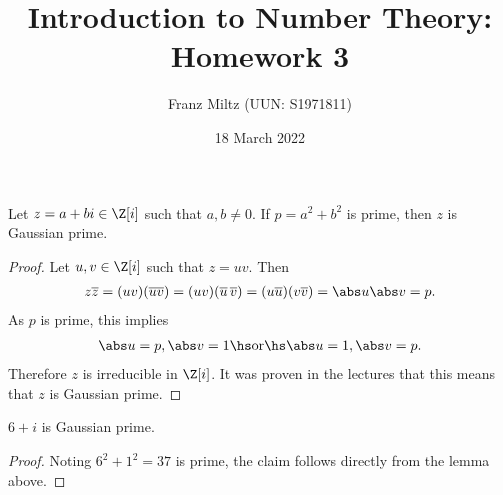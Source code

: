 \documentclass{article}
\begin{document}
\title{Introduction to Number Theory: Homework 3}
\author{Franz Miltz (UUN: S1971811)}
\date{18 March 2022}
\maketitle

\begin{lemma*}
	Let $z=a+bi\in\Z[i]$ such that $a,b\not=0$. If $p=a^2+b^2$ is prime, then $z$ is Gaussian prime.
	\begin{proof}
		Let $u,v\in\Z[i]$ such that $z=uv$. Then
		\begin{align*}
			z\overline z =  (uv)(\overline{uv}) = (u v)(\overline u\,\overline v) = (u\overline u)(v\overline v) = \abs u\abs v = p.
		\end{align*}
		As $p$ is prime, this implies
		\begin{align*}
			\abs u = p, \abs v = 1 \hs\text{or}\hs\abs u=1,\abs v=p.
		\end{align*}
		Therefore $z$ is irreducible in $\Z[i]$. It was proven in the lectures that this means that $z$ is Gaussian prime.
	\end{proof}
\end{lemma*}

\begin{claim*}[1]
	$6+i$ is Gaussian prime.
	\begin{proof}
		Noting $6^2+1^2=37$ is prime, the claim follows directly from the lemma above.
	\end{proof}
\end{claim*}
\end{document}
